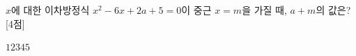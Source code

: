 $x$에 대한 이차방정식 $x^2-6x+2a+5=0$이 중근 $x=m$을 가질 때, $a+m$의 값은?  \mbox{[4점]}
\begin{choices32}{$1$}{$2$}{$3$}{$4$}{$5$}\end{choices32}
